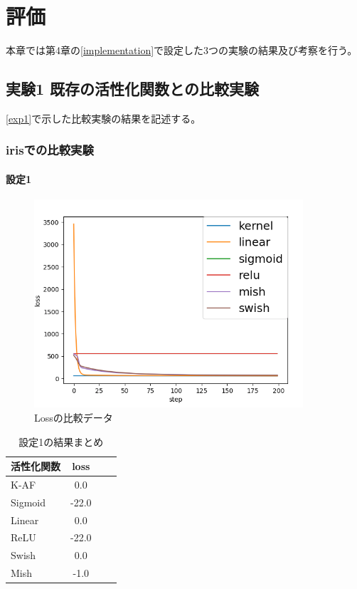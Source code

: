 \chapter{評価}
\label{evaluation}

本章では第4章の\ref{implementation}で設定した3つの実験の結果及び考察を行う。
\section{実験1 既存の活性化関数との比較実験}
\ref{exp1}で示した比較実験の結果を記述する。

\subsection{irisでの比較実験}
\label{ev:iris}

\subsubsection{設定1}


\begin{figure}[hbtp]
    \begin{center}
        \includegraphics[width=10cm]{asset/boston_0000001_SGDkaiming_normal__non_200.png}
            \caption{Lossの比較データ}
            \label{boston}
    \end{center}
\end{figure}


\begin{table}[htbp]
    \begin{center}
        \caption{設定1の結果まとめ}
        \vspace{5mm} 
        \begin{tabular}{l*{2}{c}r}
            活性化関数              & loss \\
            \hline
            K-AF            & 0.0 \\
            Sigmoid            & -22.0 \\
            Linear            & 0.0 \\
            ReLU        & -22.0 \\
            Swish           & 0.0 \\
            Mish           & -1.0 \\
    
        \end{tabular}
    \end{center}
\end{table}

